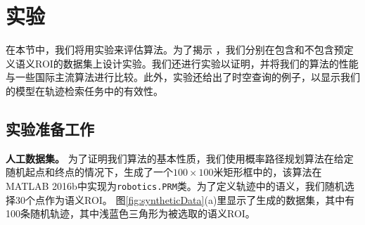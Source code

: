 \section{实验}
在本节中，我们将用实验来评估算法。为了揭示 ，我们分别在包含和不包含预定义语义ROI的数据集上设计实验。我们还进行实验以证明，并将我们的算法的性能与一些国际主流算法进行比较。此外，实验还给出了时空查询的例子，以显示我们的模型在轨迹检索任务中的有效性。

\subsection{实验准备工作}
\vspace{3mm}
\noindent\textbf{人工数据集。} 
为了证明我们算法的基本性质，我们使用概率路径规划算法\cite{kavraki1996probabilistic}在给定随机起点和终点的情况下，生成了一个$100\times100$米矩形框中的，该算法在 MATLAB 2016b中实现为\texttt{robotics.PRM}类。为了定义轨迹中的语义，我们随机选择30个点作为语义ROI。 图\ref{fig:syntheticData}(a)里显示了生成的数据集，其中有100条随机轨迹，其中浅蓝色三角形为被选取的语义ROI。


